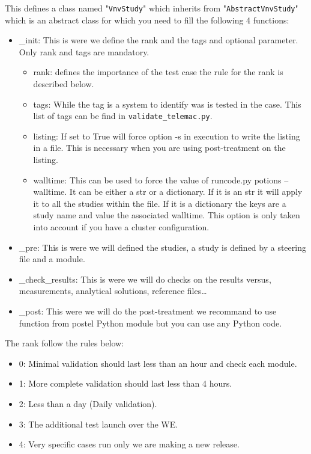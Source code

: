 This defines a class named "\verb!VnvStudy!" which inherits from
"\verb!AbstractVnvStudy!" which is an abstract class for which you need to fill
the following 4 functions:
\begin{itemize}
\item \_init: This is were we define the rank and the tags and optional
  parameter. Only rank and tags are mandatory.
  \begin{itemize}
    \item rank: defines the importance of the test case the rule for the rank is described below.
    \item tags: While the tag is a system to identify was is tested in the case. This list
    of tags can be find in \verb!validate_telemac.py!.
  \item listing: If set to True will force option -s in execution to write the
    listing in a file. This is necessary when you are using post-treatment on
      the listing.
  \item walltime: This can be used to force the value of runcode.py potions
    --walltime. It can be either a str or a dictionary. If it is an str it will
      apply it to all the studies within the file. If it is a dictionary the
      keys are a study name and value the associated walltime. This option is
      only taken into account if you have a cluster configuration.
  \end{itemize}
\item \_pre: This is were we will defined the studies, a study is defined by a
  steering file and a module.
\item \_check\_results: This is were we will do checks on the results versus,
  measurements, analytical solutions, reference files\ldots
\item \_post: This were we will do the post-treatment we recommand to use
  function from postel Python module but you can use any Python code.
\end{itemize}

The rank follow the rules below:
\begin{itemize}
\item 0: Minimal validation should last less than an hour and check each
  module.
\item 1: More complete validation should last less than 4 hours.
\item 2: Less than a day (Daily validation).
\item 3: The additional test launch over the WE.
\item 4: Very specific cases run only we are making a new release.
\end{itemize}

